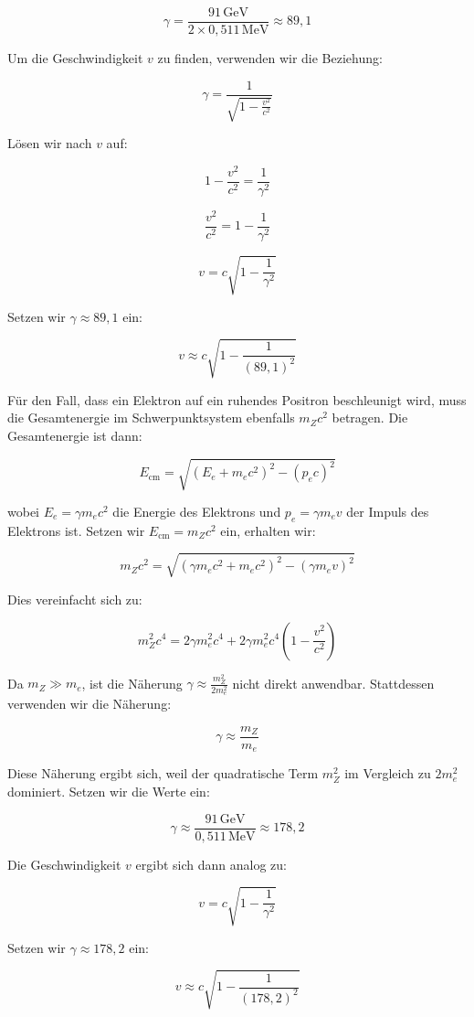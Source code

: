\documentclass[11pt,a4paper]{article}
\begin{document}
\[
\gamma = \frac{91 \, \text{GeV}}{2 \times 0{,}511 \, \text{MeV}} \approx 89{,}1
\]

Um die Geschwindigkeit \( v \) zu finden, verwenden wir die Beziehung:

\[
\gamma = \frac{1}{\sqrt{1 - \frac{v^2}{c^2}}}
\]

Lösen wir nach \( v \) auf:

\[
1 - \frac{v^2}{c^2} = \frac{1}{\gamma^2}
\]

\[
\frac{v^2}{c^2} = 1 - \frac{1}{\gamma^2}
\]

\[
v = c \sqrt{1 - \frac{1}{\gamma^2}}
\]

Setzen wir \( \gamma \approx 89{,}1 \) ein:

\[
v \approx c \sqrt{1 - \frac{1}{(89{,}1)^2}}
\]

Für den Fall, dass ein Elektron auf ein ruhendes Positron beschleunigt wird, muss die Gesamtenergie im Schwerpunktsystem ebenfalls \( m_Z c^2 \) betragen. Die Gesamtenergie ist dann:

\[
E_{\text{cm}} = \sqrt{(E_e + m_e c^2)^2 - (p_e c)^2}
\]

wobei \( E_e = \gamma m_e c^2 \) die Energie des Elektrons und \( p_e = \gamma m_e v \) der Impuls des Elektrons ist. Setzen wir \( E_{\text{cm}} = m_Z c^2 \) ein, erhalten wir:

\[
m_Z c^2 = \sqrt{(\gamma m_e c^2 + m_e c^2)^2 - (\gamma m_e v)^2}
\]

Dies vereinfacht sich zu:

\[
m_Z^2 c^4 = 2 \gamma m_e^2 c^4 + 2 \gamma m_e^2 c^4 \left(1 - \frac{v^2}{c^2}\right)
\]

Da \( m_Z \gg m_e \), ist die Näherung \( \gamma \approx \frac{m_Z^2}{2 m_e^2} \) nicht direkt anwendbar. Stattdessen verwenden wir die Näherung:

\[
\gamma \approx \frac{m_Z}{m_e}
\]

Diese Näherung ergibt sich, weil der quadratische Term \( m_Z^2 \) im Vergleich zu \( 2 m_e^2 \) dominiert. Setzen wir die Werte ein:

\[
\gamma \approx \frac{91 \, \text{GeV}}{0{,}511 \, \text{MeV}} \approx 178{,}2
\]

Die Geschwindigkeit \( v \) ergibt sich dann analog zu:

\[
v = c \sqrt{1 - \frac{1}{\gamma^2}}
\]

Setzen wir \( \gamma \approx 178{,}2 \) ein:

\[
v \approx c \sqrt{1 - \frac{1}{(178{,}2)^2}}
\]
\end{document}

